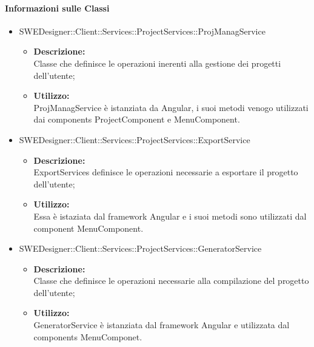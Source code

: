 		\paragraph{Informazioni sulle Classi}
		\begin{itemize}
			\item SWEDesigner::Client::Services::ProjectServices::ProjManagService
			\begin{itemize}
				\item \textbf{Descrizione: }\\
				Classe che definisce le operazioni inerenti alla gestione dei progetti
				dell'utente;
				\item \textbf{Utilizzo: }\\
				ProjManagService è istanziata da Angular, i suoi metodi venogo utilizzati
				dai components ProjectComponent e MenuComponent.
			\end{itemize}
			\item SWEDesigner::Client::Services::ProjectServices::ExportService
			\begin{itemize}
				\item \textbf{Descrizione: }\\
				ExportServices definisce le operazioni necessarie a esportare il progetto
				dell'utente;
				\item \textbf{Utilizzo: }\\
				Essa è istaziata dal framework Angular e i suoi metodi sono utilizzati
				dal component MenuComponent.
			\end{itemize}
			\item SWEDesigner::Client::Services::ProjectServices::GeneratorService
			\begin{itemize}
				\item \textbf{Descrizione: }\\
				Classe che definisce le operazioni necessarie alla compilazione del
				progetto dell'utente;
				\item \textbf{Utilizzo: }\\
				GeneratorService è istanziata dal framework Angular e utilizzata dal
				components MenuComponet.
			\end{itemize}
		\end{itemize}
